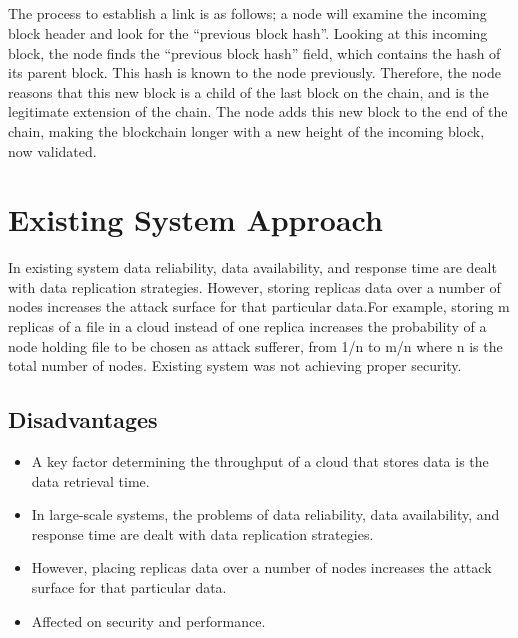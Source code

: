 \paragraph{}The process to establish a link is as follows; a node will examine the incoming block header and look for the “previous block hash”. Looking at this incoming block, the node finds the “previous block hash” field, which contains the hash of its parent block. This hash is known to the node previously. Therefore, the node reasons that this new block is a child of the last block on the chain, and is the legitimate extension of the chain. The node adds this new block to the end of the chain, making the blockchain longer with a new height of the incoming block, now validated.

\chapter{Existing System Approach}
In existing system data reliability, data availability, and response time are dealt with data replication strategies. However, storing replicas data over a number of nodes increases the attack surface for that particular data.For example, storing m replicas of a file in a cloud instead of one replica increases the probability of a node holding file to be chosen as attack sufferer, from 1/n to m/n where n is the total number of nodes. Existing system was not achieving proper security.
\section{Disadvantages}
\begin{itemize}
	\item   A key factor determining the throughput of a cloud that stores data is the data retrieval time.
	\item   In large-scale systems, the problems of data reliability, data availability, and response time are dealt with data replication strategies.
	\item   However, placing replicas data over a number of nodes increases the attack surface for that particular data.
	\item   Affected on security and performance.  
\end{itemize}
